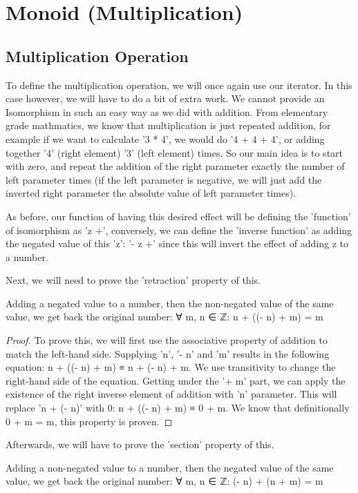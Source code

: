 \chapter{Monoid (Multiplication)}
\label{ch:monoid}

\section{Multiplication Operation}
To define the multiplication operation, we will once again use our iterator. In this case however, we will have to do a bit of extra work. We cannot provide an Isomorphism in such an easy way as we did with addition. From elementary grade mathmatics, we know that multiplication is just repeated addition, for example if we want to calculate '3 * 4', we would do '4 + 4 + 4', or adding together '4' (right element) '3' (left element) times. So our main idea is to start with zero, and repeat the addition of the right parameter exactly the number of left parameter times (if the left parameter is negative, we will just add the inverted right parameter the absolute value of left parameter times).

As before, our function of having this desired effect will be defining the 'function' of isomorphism as 'z +', conversely, we can define the 'inverse function' as adding the negated value of this 'z': '- z +' since this will invert the effect of adding z to a number.

Next, we will need to prove the 'retraction' property of this.
\begin{theorem}
  Adding a negated value to a number, then the non-negated value of the same value, we get back the original number: ∀ m, n ∈ ℤ: n + ((- n) + m) = m
\end{theorem}

\begin{proof}
  To prove this, we will first use the associative property of addition to match the left-hand side. Supplying 'n', '- n' and 'm' results in the following equation: n + ((- n) + m) ≡ n + (- n) + m. We use transitivity to change the right-hand side of the equation. Getting under the '+ m' part, we can apply the existence of the right inverse element of addition with 'n' parameter. This will replace 'n + (- n)' with 0: n + ((- n) + m) ≡ 0 + m. We know that definitionally 0 + m = m, this property is proven.
\end{proof}

Afterwards, we will have to prove the 'section' property of this.
\begin{theorem}
  Adding a non-negated value to a number, then the negated value of the same value, we get back the original number: ∀ m, n ∈ ℤ: (- n) + (n + m) = m
\end{theorem}


